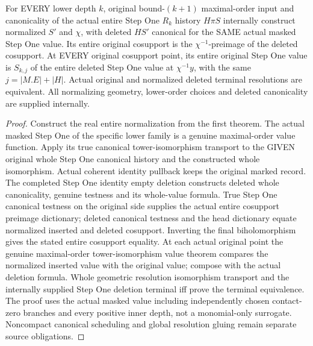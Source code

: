 \begin{theorem}
\label{hir:original-actual-empty-step-canonical-deletion}
\leanok
For EVERY lower depth $k$, original bound-$(k+1)$ maximal-order input and
canonicality of the actual entire Step One $R_k$ history $H\pi S$ internally
construct normalized $S'$ and $\chi$, with deleted $HS'$ canonical for the
SAME actual masked Step One value. Its entire original cosupport is the
$\chi^{-1}$-preimage of the deleted cosupport. At EVERY original cosupport
point, its entire original Step One value is $S_{k,j}$ of the entire deleted
Step One value at $\chi^{-1}y$, with the same $j=|M.E|+|H|$. Actual original
and normalized deleted terminal resolutions are equivalent. All normalizing
geometry, lower-order choices and deleted canonicality are supplied internally.
\end{theorem}
\begin{proof}
Construct the real entire normalization from the first theorem. The actual
masked Step One of the specific lower family is a genuine maximal-order
value function. Apply its true canonical tower-isomorphism transport to the
GIVEN original whole Step One canonical history and the constructed whole
isomorphism. Actual coherent identity pullback keeps the original marked
record. The completed Step One identity empty deletion constructs deleted
whole canonicality, genuine testness and its whole-value formula. True Step
One canonical testness on the original side supplies the actual entire
cosupport preimage dictionary; deleted canonical testness and the head
dictionary equate normalized inserted and deleted cosupport. Inverting the
final biholomorphism gives the stated entire cosupport equality. At each
actual original point the genuine maximal-order tower-isomorphism value
theorem compares the normalized inserted value with the original value;
compose with the actual deletion formula. Whole geometric resolution
isomorphism transport and the internally supplied Step One deletion terminal
iff prove the terminal equivalence. The proof uses the actual masked value
including independently chosen contact-zero branches and every positive
inner depth, not a monomial-only surrogate. Noncompact canonical scheduling
and global resolution gluing remain separate source obligations.
\end{proof}
